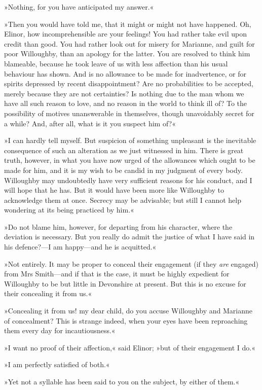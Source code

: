 »Nothing, for you have anticipated my answer.«

»Then you would have told me, that it might or might not have happened. Oh, Elinor, how incomprehensible are your feelings! You had rather take evil upon credit than good. You had rather look out for misery for Marianne, and guilt for poor Willoughby, than an apology for the latter. You are resolved to think him blameable, because he took leave of us with less affection than his usual behaviour has shown. And is no allowance to be made for inadvertence, or for spirits depressed by recent disappointment? Are no probabilities to be accepted, merely because they are not certainties? Is nothing due to the man whom we have all such reason to love, and no reason in the world to think ill of? To the possibility of motives unanswerable in themselves, though unavoidably secret for a while? And, after all, what is it you suspect him of?«

»I can hardly tell myself. But suspicion of something unpleasant is the inevitable consequence of such an alteration as we just witnessed in him. There is great truth, however, in what you have now urged of the allowances which ought to be made for him, and it is my wish to be candid in my judgment of every body. Willoughby may undoubtedly have very sufficient reasons for his conduct, and I will hope that he has. But it would have been more like Willoughby to acknowledge them at once. Secrecy may be advisable; but still I cannot help wondering at its being practiced by him.«

»Do not blame him, however, for departing from his character, where the deviation is necessary. But you really do admit the justice of what I have said in his defence?—I am happy—and he is acquitted.«

»Not entirely. It may be proper to conceal their engagement (if they \textit{are} engaged) from Mrs Smith—and if that is the case, it must be highly expedient for Willoughby to be but little in Devonshire at present. But this is no excuse for their concealing it from us.«

»Concealing it from us! my dear child, do you accuse Willoughby and Marianne of concealment? This is strange indeed, when your eyes have been reproaching them every day for incautiousness.«

»I want no proof of their affection,« said Elinor; »but of their engagement I do.«

»I am perfectly satisfied of both.«

»Yet not a syllable has been said to you on the subject, by either of them.«

